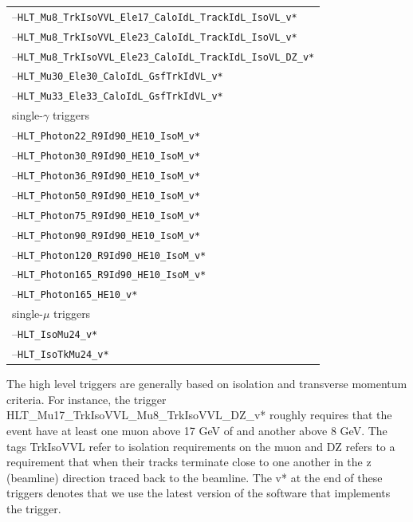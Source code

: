 \begin{table}[htb]
\begin{center}
\begin{tabular}{l}
          --\verb=HLT_Mu8_TrkIsoVVL_Ele17_CaloIdL_TrackIdL_IsoVL_v*=  \\
          --\verb=HLT_Mu8_TrkIsoVVL_Ele23_CaloIdL_TrackIdL_IsoVL_v*=  \\
          --\verb=HLT_Mu8_TrkIsoVVL_Ele23_CaloIdL_TrackIdL_IsoVL_DZ_v*=  \\
          --\verb=HLT_Mu30_Ele30_CaloIdL_GsfTrkIdVL_v*=               \\
          --\verb=HLT_Mu33_Ele33_CaloIdL_GsfTrkIdVL_v*=               \\
          \hline
          single-$\gamma$ triggers \\
          \hline
          --\verb=HLT_Photon22_R9Id90_HE10_IsoM_v*=  \\ 
          --\verb=HLT_Photon30_R9Id90_HE10_IsoM_v*=  \\
          --\verb=HLT_Photon36_R9Id90_HE10_IsoM_v*=  \\
          --\verb=HLT_Photon50_R9Id90_HE10_IsoM_v*=  \\
          --\verb=HLT_Photon75_R9Id90_HE10_IsoM_v*=  \\
          --\verb=HLT_Photon90_R9Id90_HE10_IsoM_v*=  \\
          --\verb=HLT_Photon120_R9Id90_HE10_IsoM_v*= \\
          --\verb=HLT_Photon165_R9Id90_HE10_IsoM_v*= \\
          --\verb=HLT_Photon165_HE10_v*=             \\
          \hline
          single-$\mu$ triggers \\
          \hline
          --\verb=HLT_IsoMu24_v*=  \\ 
          --\verb=HLT_IsoTkMu24_v*=  \\ 
          \hline
          \hline
        \end{tabular}
      \end{center}
    \end{table}

    The high level triggers are generally based on isolation and transverse momentum criteria. For instance, the trigger HLT\_Mu17\_TrkIsoVVL\_Mu8\_TrkIsoVVL\_DZ\_v* roughly requires that the event have at least one muon above 17 GeV of \pt and another above 8 GeV. The tags TrkIsoVVL refer to isolation requirements on the muon and DZ refers to a requirement that when their tracks terminate close to one another in the z (beamline) direction traced back to the beamline. The v* at the end of these triggers denotes that we use the latest version of the software that implements the trigger. 

